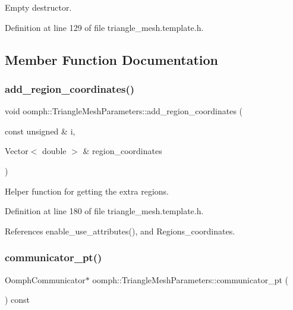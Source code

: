 Empty destructor. 



Definition at line 129 of file triangle\+\_\+mesh.\+template.\+h.



\subsection{Member Function Documentation}
\mbox{\label{classoomph_1_1TriangleMeshParameters_a83fb01a085e52e9ba9410d5d6ad47efb}} 
\subsubsection{\texorpdfstring{add\+\_\+region\+\_\+coordinates()}{add\_region\_coordinates()}}
{\footnotesize\ttfamily void oomph\+::\+Triangle\+Mesh\+Parameters\+::add\+\_\+region\+\_\+coordinates (\begin{DoxyParamCaption}\item[{const unsigned \&}]{i,  }\item[{Vector$<$ double $>$ \&}]{region\+\_\+coordinates }\end{DoxyParamCaption})\hspace{0.3cm}{\ttfamily [inline]}}



Helper function for getting the extra regions. 



Definition at line 180 of file triangle\+\_\+mesh.\+template.\+h.



References enable\+\_\+use\+\_\+attributes(), and Regions\+\_\+coordinates.

\mbox{\label{classoomph_1_1TriangleMeshParameters_a53f1dd35a25718f86d73a1dc3458644d}} 
\subsubsection{\texorpdfstring{communicator\+\_\+pt()}{communicator\_pt()}}
{\footnotesize\ttfamily Oomph\+Communicator$\ast$ oomph\+::\+Triangle\+Mesh\+Parameters\+::communicator\+\_\+pt (\begin{DoxyParamCaption}{ }\end{DoxyParamCaption}) const\hspace{0.3cm}{\ttfamily [inline]}}



